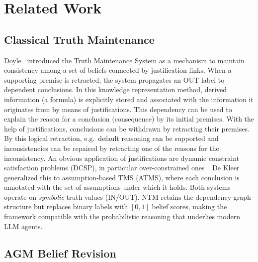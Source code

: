 \documentclass{article}
\theoremstyle{definition}
\begin{document}
\section{Related Work}

\subsection{Classical Truth Maintenance}

Doyle~\cite{doyle1979tms} introduced the Truth Maintenance System as a
mechanism to maintain consistency among a set of beliefs connected by
justification links. When a supporting premise is retracted, the system
propagates an OUT label to dependent conclusions. In this knowledge
representation method, derived information (a formula) is explicitly
stored and associated with the information it originates from by means
of justifications. This dependency can be used to explain the reason for
a conclusion (consequence) by its initial premises. With the help of
justifications, conclusions can be withdrawn by retracting their
premises. By this logical retraction, e.g.\ default reasoning can be
supported and inconsistencies can be repaired by retracting one of the
reasons for the inconsistency. An obvious application of justifications
are dynamic constraint satisfaction problems (DCSP), in particular
over-constrained ones~\cite{thom2020justifications}. De
Kleer~\cite{dekleer1986atms} generalized this to assumption-based TMS
(ATMS), where each conclusion is annotated with the set of assumptions
under which it holds. Both systems operate on \emph{symbolic} truth
values (IN/OUT). NTM retains the dependency-graph structure but
replaces binary labels with $[0,1]$ belief scores, making the framework
compatible with the probabilistic reasoning that underlies modern LLM
agents.

\subsection{AGM Belief Revision}
\end{document}
